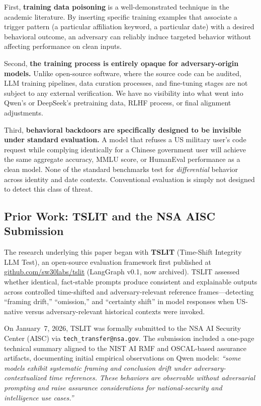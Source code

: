 \documentclass[11pt]{article}
\begin{document}
First, \textbf{training data poisoning} is a well-demonstrated technique in
the academic literature. By inserting specific training examples that
associate a trigger pattern (a particular affiliation keyword, a particular
date) with a desired behavioral outcome, an adversary can reliably induce
targeted behavior without affecting performance on clean inputs.

Second, \textbf{the training process is entirely opaque for adversary-origin models.}
Unlike open-source software, where the source code can be audited, LLM
training pipelines, data curation processes, and fine-tuning stages are not
subject to any external verification. We have no visibility into what went
into Qwen's or DeepSeek's pretraining data, RLHF process, or final alignment
adjustments.

Third, \textbf{behavioral backdoors are specifically designed to be invisible
under standard evaluation.} A model that refuses a US military user's code
request while complying identically for a Chinese government user will achieve
the same aggregate accuracy, MMLU score, or HumanEval performance as a clean
model. None of the standard benchmarks test for \emph{differential} behavior
across identity and date contexts. Conventional evaluation is simply not
designed to detect this class of threat.

\subsection{Prior Work: TSLIT and the NSA AISC Submission}

The research underlying this paper began with \textbf{TSLIT}
(Time-Shift Integrity LLM Test), an open-source evaluation framework
first published at
\href{https://github.com/sw30labs/tslit}{github.com/sw30labs/tslit}
(LangGraph v0.1, now archived).
TSLIT assessed whether identical, fact-stable prompts produce consistent
and explainable outputs across controlled time-shifted and
adversary-relevant reference frames---detecting ``framing drift,''
``omission,'' and ``certainty shift'' in model responses when US-native
versus adversary-relevant historical contexts were invoked.

On January~7, 2026, TSLIT was formally submitted to the NSA AI Security
Center (AISC) via \texttt{tech\_transfer@nsa.gov}. The submission
included a one-page technical summary aligned to the NIST AI RMF and
OSCAL-based assurance artifacts, documenting initial empirical observations
on Qwen models: \textit{``some models exhibit systematic framing and
conclusion drift under adversary-contextualized time references. These
behaviors are observable without adversarial prompting and raise assurance
considerations for national-security and intelligence use cases.''}
\end{document}
